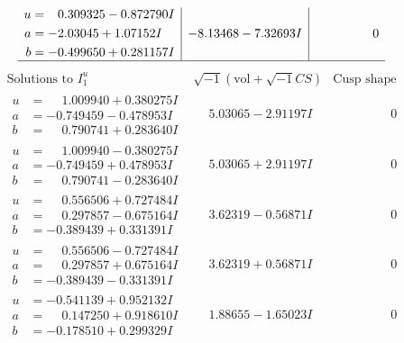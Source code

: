 \documentclass[1p]{elsarticle_modified}
\theoremstyle{definition}
\newcommand{\I}{\sqrt{-1}}
\begin{document}
$$\begin{array}{c|c|c}
\begin{aligned}
u &= \phantom{-}0.309325 - 0.872790 I \\
a &= -2.03045 + 1.07152 I \\
b &= -0.499650 + 0.281157 I\end{aligned}
 & -8.13468 - 7.32693 I & \phantom{-0.000000 } 0\\
 \hline 
 \end{array}$$\newpage$$\begin{array}{c|c|c}  
\text{Solutions to }I^u_{1}& \I (\text{vol} + \sqrt{-1}CS) & \text{Cusp shape}\\
 \hline 
\begin{aligned}
u &= \phantom{-}1.009940 + 0.380275 I \\
a &= -0.749459 - 0.478953 I \\
b &= \phantom{-}0.790741 + 0.283640 I\end{aligned}
 & \phantom{-}5.03065 - 2.91197 I & \phantom{-0.000000 } 0 \\ \hline\begin{aligned}
u &= \phantom{-}1.009940 - 0.380275 I \\
a &= -0.749459 + 0.478953 I \\
b &= \phantom{-}0.790741 - 0.283640 I\end{aligned}
 & \phantom{-}5.03065 + 2.91197 I & \phantom{-0.000000 } 0 \\ \hline\begin{aligned}
u &= \phantom{-}0.556506 + 0.727484 I \\
a &= \phantom{-}0.297857 - 0.675164 I \\
b &= -0.389439 + 0.331391 I\end{aligned}
 & \phantom{-}3.62319 - 0.56871 I & \phantom{-0.000000 } 0 \\ \hline\begin{aligned}
u &= \phantom{-}0.556506 - 0.727484 I \\
a &= \phantom{-}0.297857 + 0.675164 I \\
b &= -0.389439 - 0.331391 I\end{aligned}
 & \phantom{-}3.62319 + 0.56871 I & \phantom{-0.000000 } 0 \\ \hline\begin{aligned}
u &= -0.541139 + 0.952132 I \\
a &= \phantom{-}0.147250 + 0.918610 I \\
b &= -0.178510 + 0.299329 I\end{aligned}
 & \phantom{-}1.88655 - 1.65023 I & \phantom{-0.000000 } 0 \\ \hline\begin{aligned}

\end{aligned}
\end{array}$$
\end{document}
